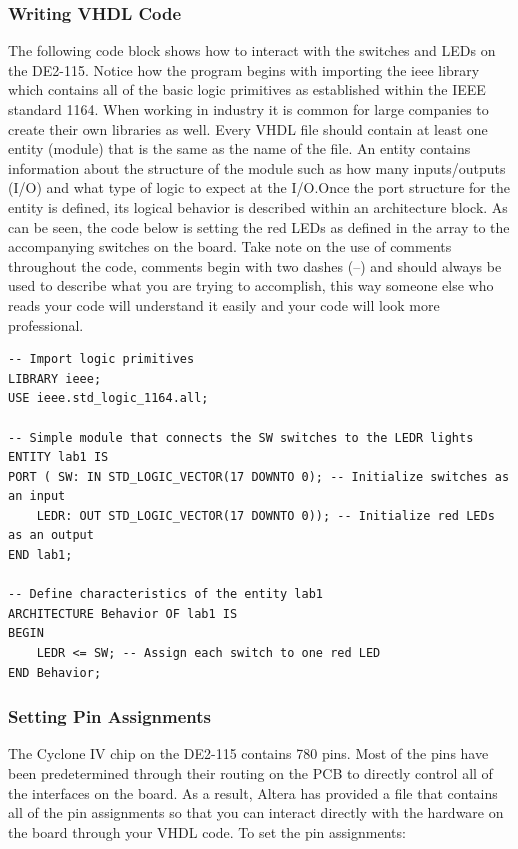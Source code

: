 \subsubsection{Writing VHDL Code}

The following code block shows how to interact with the switches and LEDs on the DE2-115. Notice how the program begins with importing the ieee library which contains all of the basic logic primitives as established within the IEEE standard 1164. When working in industry it is common for large companies to create their own libraries as well. Every VHDL file should contain at least one entity (module) that is the same as the name of the file. An entity contains information about the structure of the module such as how many inputs/outputs (I/O) and what type of logic to expect at the I/O.Once the port structure for the entity is defined, its logical behavior is described within an architecture block. As can be seen, the code below is setting the red LEDs as defined in the array to the accompanying switches on the board. Take note on the use of comments throughout the code, comments begin with two dashes (--) and should always be used to describe what you are trying to accomplish, this way someone else who reads your code will understand it easily and your code will look more professional. 

\begin{lstlisting}
-- Import logic primitives
LIBRARY ieee;
USE ieee.std_logic_1164.all;

-- Simple module that connects the SW switches to the LEDR lights
ENTITY lab1 IS
PORT ( SW: IN STD_LOGIC_VECTOR(17 DOWNTO 0); -- Initialize switches as an input
	LEDR: OUT STD_LOGIC_VECTOR(17 DOWNTO 0)); -- Initialize red LEDs as an output
END lab1;

-- Define characteristics of the entity lab1
ARCHITECTURE Behavior OF lab1 IS
BEGIN
	LEDR <= SW; -- Assign each switch to one red LED
END Behavior;
\end{lstlisting}

\subsubsection{Setting Pin Assignments}
The Cyclone IV chip on the DE2-115 contains 780 pins. Most of the pins  have been predetermined through their routing on the PCB to directly control all of the interfaces on the board. As a result, Altera has provided a file that contains all of the pin assignments so that you can interact directly with the hardware on the board through your VHDL code. To set the pin assignments:


